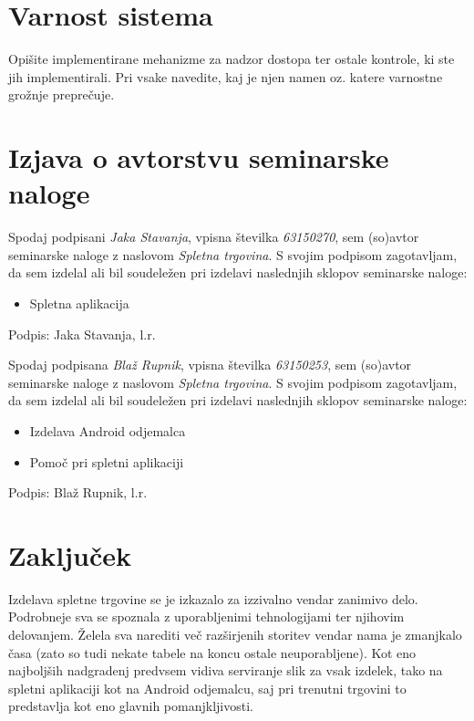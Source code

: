 \documentclass[a4paper,12pt]{report}
\newcommand{\naslov}     {Spletna trgovina}
\newcommand{\prviavtor}  {Jaka Stavanja}
\newcommand{\prviindeks} {63150270}
\newcommand{\drugiavtor} {Blaž Rupnik}
\newcommand{\drugiindeks}{63150253}
\begin{document}
\chapter{Varnost sistema}

Opišite implementirane mehanizme za nadzor dostopa ter ostale kontrole, ki ste jih implementirali. Pri vsake navedite, kaj je njen namen oz. katere varnostne grožnje preprečuje.

\chapter{Izjava o avtorstvu seminarske naloge}

Spodaj podpisani \textit{\prviavtor}, vpisna številka \textit{\prviindeks}, sem (so)avtor seminarske naloge z naslovom \textit{\naslov}. S svojim podpisom zagotavljam, da sem izdelal ali bil soudeležen pri izdelavi naslednjih sklopov seminarske naloge:
\begin{itemize}
    \item Spletna aplikacija
\end{itemize}

Podpis: {\prviavtor}, l.r.

\newpage

Spodaj podpisana \textit{\drugiavtor}, vpisna številka \textit{\drugiindeks}, sem (so)avtor seminarske naloge z naslovom \textit{\naslov}. S svojim podpisom zagotavljam, da sem izdelal ali bil soudeležen pri izdelavi naslednjih sklopov seminarske naloge:
\begin{itemize}
    \item Izdelava Android odjemalca
    \item Pomoč pri spletni aplikaciji
\end{itemize}

Podpis: {\drugiavtor}, l.r.

\chapter{Zaključek}

Izdelava spletne trgovine se je izkazalo za izzivalno vendar zanimivo delo. Podrobneje sva se spoznala z uporabljenimi tehnologijami ter njihovim delovanjem. Želela sva narediti več razširjenih storitev vendar nama je zmanjkalo časa (zato so tudi nekate tabele na koncu ostale neuporabljene). Kot eno najboljših nadgradenj predvsem vidiva serviranje slik za vsak izdelek, tako na spletni aplikaciji kot na Android odjemalcu, saj pri trenutni trgovini to predstavlja kot eno glavnih pomanjkljivosti.
\end{document}
